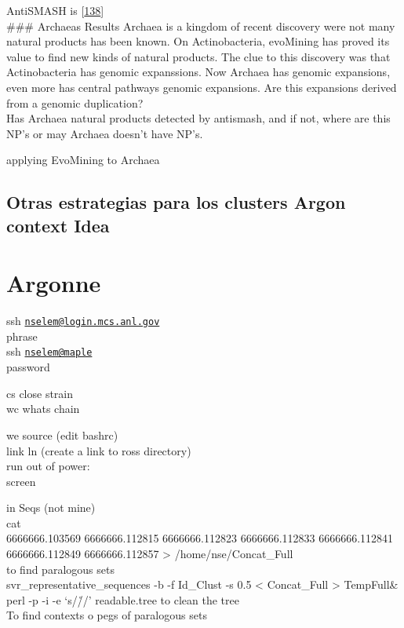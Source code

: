 \documentclass[12pt,twoside]{reedthesis}
\begin{document}
  AntiSMASH is
  {[}\protect\hyperlink{ref-weberux5fantismashux5f2015}{138}{]}\\
  \#\#\# Archaeas Results Archaea is a kingdom of recent discovery were
  not many natural products has been known. On Actinobacteria, evoMining
  has proved its value to find new kinds of natural products. The clue to
  this discovery was that Actinobacteria has genomic expanssions. Now
  Archaea has genomic expansions, even more has central pathways genomic
  expansions. Are this expansions derived from a genomic duplication?\\
  Has Archaea natural products detected by antismash, and if not, where
  are this NP's or may Archaea doesn't have NP's.
  
  applying EvoMining to Archaea
  
  \subsection{Otras estrategias para los clusters Argon context
  Idea}\label{otras-estrategias-para-los-clusters-argon-context-idea}
  
  \section{Argonne}\label{argonne}
  
  ssh
  \href{mailto:nselem@login.mcs.anl.gov}{\nolinkurl{nselem@login.mcs.anl.gov}}\\
  phrase\\
  ssh \href{mailto:nselem@maple}{\nolinkurl{nselem@maple}}\\
  password
  
  cs close strain\\
  wc whats chain
  
  we source (edit bashrc)\\
  link ln (create a link to ross directory)\\
  run out of power:\\
  screen
  
  in Seqs (not mine)\\
  cat\\
  6666666.103569 6666666.112815 6666666.112823 6666666.112833
  6666666.112841 6666666.112849 6666666.112857 \textgreater{}
  /home/nse/Concat\_Full\\
  to find paralogous sets\\
   svr\_representative\_sequences -b -f Id\_Clust -s 0.5 \textless{}
  Concat\_Full \textgreater{} TempFull\&\\
   perl -p -i -e `s/\r//' readable.tree to clean the tree\\
  To find contexts o pegs of paralogous sets
  
\end{document}
